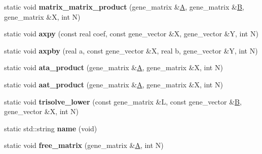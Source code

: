 \begin{DoxyCompactItemize}
static void {\bfseries matrix\+\_\+matrix\+\_\+product} (gene\+\_\+matrix \&\hyperlink{group___core___module_class_eigen_1_1_matrix}{A}, gene\+\_\+matrix \&\hyperlink{group___core___module_class_eigen_1_1_matrix}{B}, gene\+\_\+matrix \&X, int N)
\item 
\mbox{\label{classublas__interface_acc36f0db678070ed64c4565b6a7638b2}} 
static void {\bfseries axpy} (const real coef, const gene\+\_\+vector \&X, gene\+\_\+vector \&Y, int N)
\item 
\mbox{\label{classublas__interface_a6d2438d82e457ed5550bc3df57e660a4}} 
static void {\bfseries axpby} (real a, const gene\+\_\+vector \&X, real b, gene\+\_\+vector \&Y, int N)
\item 
\mbox{\label{classublas__interface_a89da1b812a6df68e9833db1449670178}} 
static void {\bfseries ata\+\_\+product} (gene\+\_\+matrix \&\hyperlink{group___core___module_class_eigen_1_1_matrix}{A}, gene\+\_\+matrix \&X, int N)
\item 
\mbox{\label{classublas__interface_ac0b4af8032156a1d7e37e3d19220b5e8}} 
static void {\bfseries aat\+\_\+product} (gene\+\_\+matrix \&\hyperlink{group___core___module_class_eigen_1_1_matrix}{A}, gene\+\_\+matrix \&X, int N)
\item 
\mbox{\label{classublas__interface_aff37a09a043018d1eb13de586b070598}} 
static void {\bfseries trisolve\+\_\+lower} (const gene\+\_\+matrix \&L, const gene\+\_\+vector \&\hyperlink{group___core___module_class_eigen_1_1_matrix}{B}, gene\+\_\+vector \&X, int N)
\item 
\mbox{\label{classublas__interface_a32117e7ead7a2a8f4e3d061c62effb40}} 
static std\+::string {\bfseries name} (void)
\item 
\mbox{\label{classublas__interface_a21c3496aaa06183e49f5cb6e07b50860}} 
static void {\bfseries free\+\_\+matrix} (gene\+\_\+matrix \&\hyperlink{group___core___module_class_eigen_1_1_matrix}{A}, int N)
\item 
\mbox{\label{classublas__interface_a82dfbf57b22b1604aa1027949fa89f06}} 

\end{DoxyCompactItemize}
